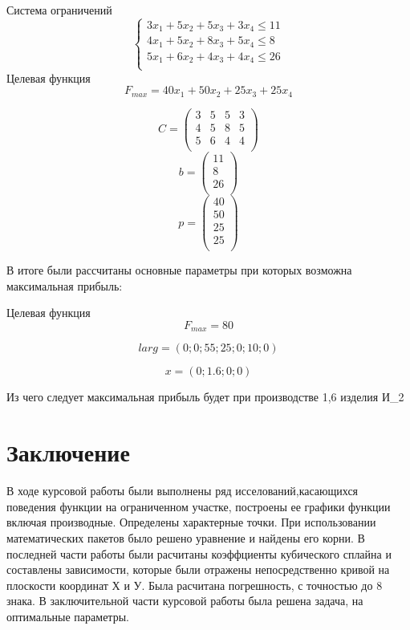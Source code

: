 \documentclass[russian,utf8,nocolumnxxxi,nocolumnxxxii]{eskdtext}
\begin{document}
Система ограничений
\begin{equation}
\left\{
\begin{array}{l}
    3x_1+5x_2+5x_3+3x_4 \leq 11\\
    4x_1+5x_2+8x_3+5x_4 \leq 8\\
    5x_1+6x_2+4x_3+4x_4 \leq 26\\
\end{array}
\right.
\end{equation}
Целевая функция 
\begin{equation}
F_{max}=40x_1+50x_2+25x_3+25x_4
\end{equation}

\begin{equation}
C = \begin{pmatrix}
3 & 5 & 5 & 3 \\
4 & 5 & 8 & 5 \\         
5 & 6 & 4 & 4 \\
\end{pmatrix}
\end{equation}
\begin{equation}
b = \begin{pmatrix}
11  \\
8  \\         
26  \\
\end{pmatrix}
\end{equation}
\begin{equation}
p = \begin{pmatrix}
40 \\
50 \\         
25 \\
25 \\
\end{pmatrix}
\end{equation}

В итоге были рассчитаны основные параметры при которых возможна максимальная прибыль:

Целевая функция $$F_{max}=80$$

$$larg=(0;0;55;25;0;10;0)$$

$$x=(0;1.6;0;0)$$

Из чего следует максимальная прибыль будет при производстве 1,6 изделия И_2
\clearpage
\newpage
\section{Заключение}
В ходе курсовой работы были выполнены ряд исселований,касающихся поведения функции на ограниченном участке, построены ее графики функции включая производные. Определены характерные точки.
При использовании математических пакетов было решено уравнение и найдены его корни.
В последней части работы были расчитаны коэффциенты кубического сплайна и составлены зависимости, которые были отражены непосредственно кривой на плоскости координат Х и У. Была расчитана погрешность, с точностью до 8 знака.
В заключительной части курсовой работы была решена задача, на оптимальные параметры.
\clearpage
\end{document}
